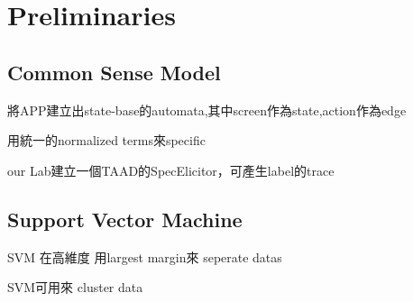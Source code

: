 
\chapter{Preliminaries}\label{ch:preliminaries}


\section{Common Sense Model}

將APP建立出state-base的automata,其中screen作為state,action作為edge

用統一的normalized terms來specific

our Lab建立一個TAAD的SpecElicitor，可產生label的trace


\section{Support Vector Machine}

SVM 在高維度 用largest margin來 seperate datas 

SVM可用來 cluster data